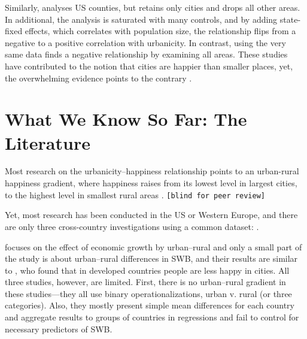 \documentclass[10pt, letterpaper]{article}
\begin{document}
Similarly, \cite{glaeser14} analyses US counties, but retains only cities and drops all other areas. In additional, the analysis is saturated with many controls, and by adding state-fixed effects, which correlates with population size, the relationship flips from a negative to a positive correlation with urbanicity. In contrast, \cite{aok_brfss_city_csize16} using the very same data finds a negative relationship by examining all areas. 
These studies have contributed to the notion that cities are happier than smaller places, yet, the overwhelming evidence points to the contrary \citep{gurin60,campbell76etal,aok11a,aok_brfss_city_cize16,senior_ny_sep16_14,ons11,ibt13,morrison15,lenzi16D,morrison11,aok20}.



\section*{What We Know So Far: The Literature}

Most research on the urbanicity--happiness relationship points to an urban-rural happiness gradient, where happiness raises from its lowest level in largest cities, to the highest level in smallest rural areas
\citep[e.g.,][]{campbell76etal,aok11a, aok_brfss_city_cize16,aok20}. \texttt{[blind for peer review]} %

Yet, most research has been conducted in the US or Western Europe, and there are only three cross-country investigations using a common dataset: \citet{aokcities,easterlin10al,burger20}.

\citet{easterlin10al} focuses on the effect of economic growth by urban--rural and only a small part of the study is about urban--rural differences in SWB, and their results are similar to \citet{aokcities}, who found that in developed countries people are less happy in cities. All three studies, however, are limited. 
%
First, there is no urban--rural gradient in these studies---they all use binary operationalizations, urban v. rural (or three categories). Also, they mostly present simple mean differences for each country and aggregate results to groups of countries in regressions and fail to control for necessary predictors of SWB. 
\end{document}
